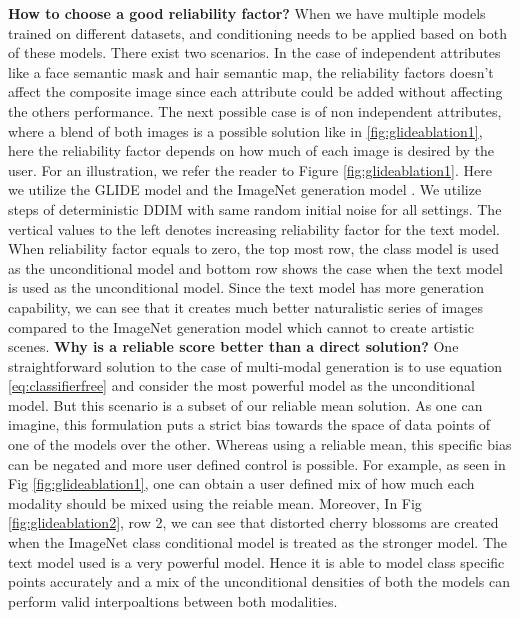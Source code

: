 \documentclass[10pt,twocolumn,letterpaper]{article}
\begin{document}
\noindent\textbf{How to choose a good reliability factor?}
 When we have multiple models trained on different datasets, and conditioning needs to be applied based on both of these models. There exist two scenarios. In the case of independent attributes like a face semantic mask  and hair semantic map, the reliability factors doesn't affect the composite image since each attribute could be added without affecting the others performance. The next possible case is of non independent attributes, where a blend of both images is a possible solution like in \ref{fig:glideablation1}, here the reliability factor depends on how much of each image is desired by the user. For an illustration, we refer the reader to Figure \ref{fig:glideablation1}. Here we utilize the GLIDE model and the ImageNet generation model \cite{dhariwal2021diffusion}. We utilize  steps of deterministic DDIM \cite{song2020denoising} with same random initial noise for all settings.  The vertical values to the left denotes increasing reliability factor for the text model. When reliability factor equals to zero, the top most row, the class model is used as the unconditional model and bottom row shows the case when the text model is used as the unconditional model. Since the text model has more generation capability, we can see that it creates much better naturalistic series of images compared to the ImageNet generation model \cite{dhariwal2021diffusion} which cannot to create artistic scenes.
 \newline
 \noindent\textbf{Why is a reliable score better than a direct solution?} One straightforward solution to the case of multi-modal generation is to use equation \eqref{eq:classifierfree} and  consider the most powerful model as the unconditional model. But this scenario is  a subset of our reliable mean solution. As one can imagine, this formulation puts a strict bias towards the space of data points of one of the models over the other. 
 Whereas using a reliable mean, this specific bias can be negated  and more user defined control is possible. For example, as seen in Fig \ref{fig:glideablation1}, one can obtain a user defined mix of how much each modality should be mixed using the reiable mean. Moreover, In Fig  \ref{fig:glideablation2},
 row 2, we can see that distorted cherry blossoms are created when the ImageNet class conditional model is treated as the stronger model. The text model used is a very powerful model\cite{nichol2021glide}. Hence it is able to model class specific points accurately and a mix of the unconditional densities of both the models can perform valid interpoaltions between both modalities.
 
\end{document}
